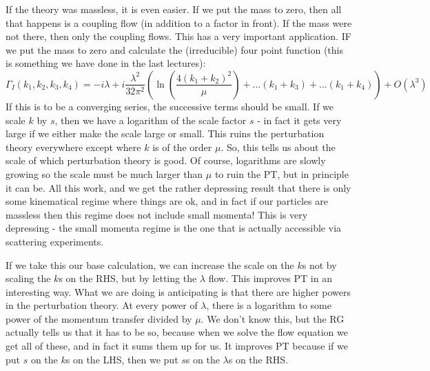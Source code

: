 If the theory was massless, it is even easier. If we put the mass to zero, then all that happens is a coupling flow (in addition to a factor in front). If the mass were not there, then only the coupling flows. This has a very important application. IF we put the mass to zero and calculate the (irreducible) four point function (this is something we have done in the last lectures):
\begin{equation}
    \Gamma_I(k_1, k_2, k_3, k_4) = -i\lambda + i\frac{\lambda^2}{32\pi^2}\left(\ln(\frac{4(k_1 + k_2)^2}{\mu}) + \ldots(k_1 + k_3) + \ldots(k_1 + k_4)\right) + O(\lambda^3)
\end{equation}
If this is to be a converging series, the successive terms should be small. If we scale $k$ by $s$, then we have a logarithm of the scale factor $s$ - in fact it gets very large if we either make the scale large or small. This ruins the perturbation theory everywhere except where $k$ is of the order $\mu$. So, this tells us about the scale of which perturbation theory is good. Of course, logarithms are slowly growing so the scale must be much larger than $\mu$ to ruin the PT, but in principle it can be. All this work, and we get the rather depressing result that there is only some kinematical regime where things are ok, and in fact if our particles are massless then this regime does not include small momenta! This is very depressing - the small momenta regime is the one that is actually accessible via scattering experiments.

If we take this our base calculation, we can increase the scale on the $k$s not by scaling the $k$s on the RHS, but by letting the $\lambda$ flow. This improves PT in an interesting way. What we are doing is anticipating is that there are higher powers in the perturbation theory. At every power of $\lambda$, there is a logarithm to some power of the momentum transfer divided by $\mu$. We don't know this, but the RG actually tells us that it has to be so, because when we solve the flow equation we get all of these, and in fact it sums them up for us. It improves PT because if we put $s$ on the $k$s on the LHS, then we put $s$s on the $\lambda$s on the RHS.

